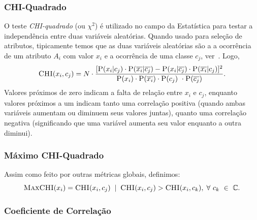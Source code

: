 \subsubsection{CHI-Quadrado}
\label{subsubsection::chi}

O teste \textit{CHI-quadrado} (ou $\chi^2$) é utilizado no campo da Estatística para testar a independência entre duas variáveis aleatórias. Quando usado para seleção de atributos, tipicamente temos que as duas variáveis aleatórias são a a ocorrência de um atributo $A_i$ com valor $x_i$ e a ocorrência de uma classe $c_j$, ver~\cite{Zheng03}. Logo,
\begin{equation}\label{eqn::chi}
  \textsc{CHI}(x_i, c_j) = N \cdot \frac{ [ \textsc{P}(x_i|c_j) \cdot \textsc{P}(\overline{x_i}|\overline{c_j}) - \textsc{P}(x_i|\overline{c_j}) \cdot \textsc{P}(\overline{x_i}|c_j) ]^2 } {\textsc{P}(x_i) \cdot \textsc{P}(\overline{x_i}) \cdot \textsc{P}(c_j) \ \cdot \textsc{P}(\overline{c_j}) }.
\end{equation}
Valores próximos de zero indicam a falta de relação entre $x_i$ e $c_j$, enquanto valores próximos a um indicam tanto uma correlação positiva (quando ambas variáveis aumentam ou diminuem seus valores juntas), quanto uma correlação negativa (significando que uma variável aumenta seu valor enquanto a outra diminui).

\subsubsection{Máximo CHI-Quadrado}
\label{subsubsection::maxchi}

Assim como feito por outras métricas globais, definimos:
\begin{equation}\label{eqn::maxchi}
\textsc{MaxCHI}(x_i) = \textsc{CHI}(x_i,c_j) \; \; | \;\; \textsc{CHI}(x_i, c_j) > \textsc{CHI}(x_i, c_k), \; \forall\ c_k\ \in\ \mathbb{C}.
\end{equation}


\subsubsection{Coeficiente de Correlação}
\label{subsubsection::cc}

